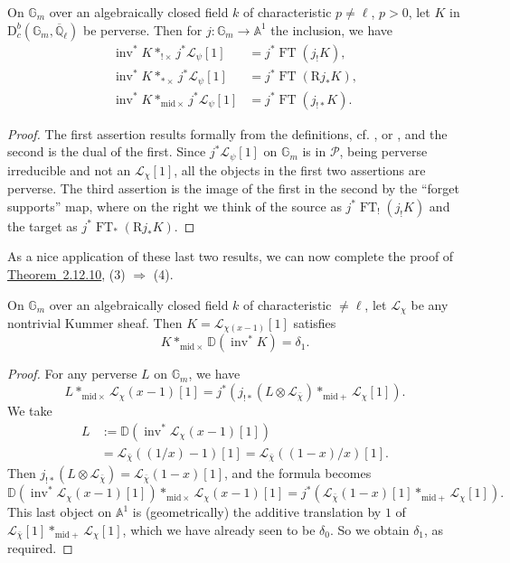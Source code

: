 On \(\mathbb{G}_m\) over an algebraically closed field \(k\) of characteristic
\(p\ne\ell\), \(p>0\), let \(K\) in
\(\mathrm{D}^b_c(\mathbb{G}_m,\overline{\mathbb{Q}}_\ell)\) be perverse. Then
for \(j:\mathbb{G}_m\to\mathbb{A}^1\) the inclusion, we have
\[
\begin{aligned}
  \operatorname{inv}^*K*_{!\times}j^*\mathcal{L}_\psi[1]
  &=j^*\operatorname{FT}(j_!K),\\
  \operatorname{inv}^*K*_{*\times}j^*\mathcal{L}_\psi[1]
  &=j^*\operatorname{FT}(\mathrm{R}j_*K),\\
  \operatorname{inv}^*K*_{\mathrm{mid}\times}j^*\mathcal{L}_\psi[1]
  &=j^*\operatorname{FT}(j_{!*}K).
\end{aligned}
\]
\begin{proof}
The first assertion results formally from the definitions, cf.
\cite[page~264]{Ka-ESDE}, or \cite[8.6.1]{Ka-GKM}, and the second is the dual of
the first. Since \(j^*\mathcal{L}_\psi[1]\) on \(\mathbb{G}_m\) is in
\(\mathcal{P}\), being perverse irreducible and not an
\(\mathcal{L}_\chi[1]\), all the objects in the first two assertions are
perverse. The third assertion is the image of the first in the second by the
``forget supports'' map, where on the right we think of the source as
\(j^*\operatorname{FT}_!(j_!K)\) and the target as
\(j^*\operatorname{FT}_*(\mathrm{R}j_*K)\).
\end{proof}

As a nice application of these last two results, we can now complete the proof
of \hyperref[thm:2.12.10]{Theorem~2.12.10}, (3) \(\Rightarrow\) (4).

On \(\mathbb{G}_m\) over an algebraically closed field \(k\) of characteristic
\(\ne\ell\), let \(\mathcal{L}_\chi\) be any nontrivial Kummer sheaf. Then
\(K=\mathcal{L}_{\chi(x-1)}[1]\) satisfies
\[
  K*_{\mathrm{mid}\times}\mathbb{D}(\operatorname{inv}^*K)=\delta_1.
\]
\begin{proof}
For any perverse \(L\) on \(\mathbb{G}_m\), we have
\[
  L*_{\mathrm{mid}\times}\mathcal{L}_\chi(x-1)[1]
  =
  j^*(j_{!*}(L\otimes\mathcal{L}_{\bar{\chi}})
  *_{\mathrm{mid}+}\mathcal{L}_\chi[1]).
\]
We take
\[
\begin{aligned}
  L
  &:=
  \mathbb{D}(\operatorname{inv}^*\mathcal{L}_\chi(x-1)[1])\\
  &=
  \mathcal{L}_{\bar{\chi}}((1/x)-1)[1]
  =
  \mathcal{L}_{\bar{\chi}}((1-x)/x)[1].
\end{aligned}
\]
Then \(j_{!*}(L\otimes\mathcal{L}_{\bar{\chi}})
=\mathcal{L}_{\bar{\chi}}(1-x)[1]\), and the formula becomes
\[
  \mathbb{D}(\operatorname{inv}^*\mathcal{L}_\chi(x-1)[1])
  *_{\mathrm{mid}\times}\mathcal{L}_\chi(x-1)[1]
  =
  j^*(\mathcal{L}_{\bar{\chi}}(1-x)[1]
  *_{\mathrm{mid}+}\mathcal{L}_\chi[1]).
\]
This last object on \(\mathbb{A}^1\) is (geometrically) the additive
translation by \(1\) of
\(\mathcal{L}_{\bar{\chi}}[1]*_{\mathrm{mid}+}\mathcal{L}_\chi[1]\), which we
have already seen to be \(\delta_0\). So we obtain \(\delta_1\), as required.
\end{proof}

